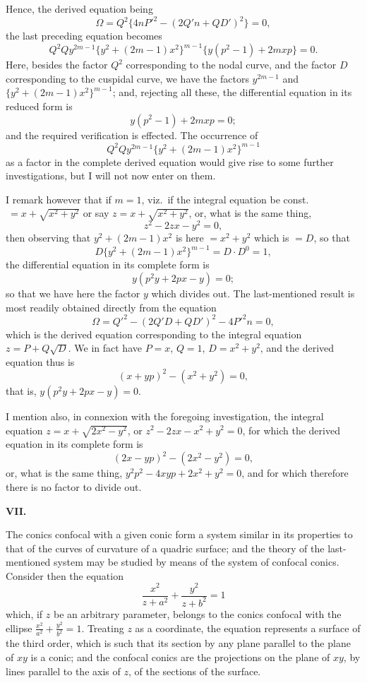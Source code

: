 \documentclass[11pt,a4paper]{article}
\begin{document}
Hence, the derived equation being
\[
\Omega = Q^2 \{4nP'^2 - (2Q'n + QD')^2\} = 0,
\]
the last preceding equation becomes
\[
Q^2 Qy^{2m-1}\{y^2 + (2m-1)x^2\}^{m-1}\{y(p^2-1) + 2mxp\} = 0.
\]
Here, besides the factor $Q^2$ corresponding to the nodal curve, and the factor $D$ corresponding to the cuspidal curve, we have the factors $y^{2m-1}$ and $\{y^2 + (2m-1)x^2\}^{m-1}$; and, rejecting all these, the differential equation in its reduced form is
\[
y(p^2-1) + 2mxp = 0;
\]
and the required verification is effected. The occurrence of
\[
Q^2 Qy^{2m-1}\{y^2 + (2m-1)x^2\}^{m-1}
\]
as a factor in the complete derived equation would give rise to some further investigations, but I will not now enter on them.

I remark however that if $m=1$, viz.\ if the integral equation be const.$\ = x + \sqrt{x^2+y^2}$ or say $z = x + \sqrt{x^2+y^2}$, or, what is the same thing,
\[
z^2 - 2zx - y^2 = 0,
\]
then observing that $y^2 + (2m-1)x^2$ is here $=x^2+y^2$ which is $=D$, so that
\[
D\{y^2 + (2m-1)x^2\}^{m-1} = D \cdot D^0 = 1,
\]
the differential equation in its complete form is
\[
y(p^2 y + 2px - y) = 0;
\]
so that we have here the factor $y$ which divides out. The last-mentioned result is most readily obtained directly from the equation
\[
\Omega = Q'^2 - (2Q'D + QD')^2 - 4P'^2 n = 0,
\]
which is the derived equation corresponding to the integral equation $z = P + Q\sqrt{D}$. We in fact have $P=x$, $Q=1$, $D=x^2+y^2$, and the derived equation thus is
\[
(x+yp)^2 - (x^2+y^2) = 0,
\]
that is, $y(p^2 y + 2px - y) = 0$.

I mention also, in connexion with the foregoing investigation, the integral equation $z = x + \sqrt{2x^2 - y^2}$, or $z^2 - 2zx - x^2 + y^2 = 0$, for which the derived equation in its complete form is
\[
(2x-yp)^2 - (2x^2 - y^2) = 0,
\]
or, what is the same thing, $y^2 p^2 - 4xyp + 2x^2 + y^2 = 0$, and for which therefore there is no factor to divide out.

\newpage
\noindent \textbf{VII.}

\medskip

\noindent The conics confocal with a given conic form a system similar in its properties to that of the curves of curvature of a quadric surface; and the theory of the last-mentioned system may be studied by means of the system of confocal conics. Consider then the equation
\[
\frac{x^2}{z+a^2} + \frac{y^2}{z+b^2} = 1
\]
which, if $z$ be an arbitrary parameter, belongs to the conics confocal with the ellipse $\frac{x^2}{a^2} + \frac{y^2}{b^2} = 1$. Treating $z$ as a coordinate, the equation represents a surface of the third order, which is such that its section by any plane parallel to the plane of $xy$ is a conic; and the confocal conics are the projections on the plane of $xy$, by lines parallel to the axis of $z$, of the sections of the surface.
\end{document}
